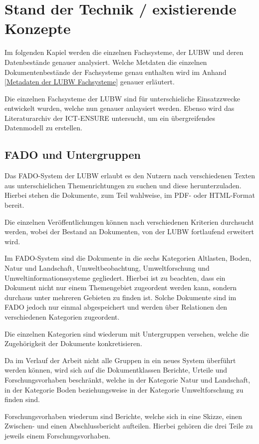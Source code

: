\section{Stand der Technik / existierende Konzepte} \label{Stand der Technik}
Im folgenden Kapiel werden die einzelnen Fachsysteme, der \ac{LUBW} und deren Datenbest\"ande genauer analysiert. Welche Metdaten die einzelnen Dokumentenbest\"ande der Fachsysteme genau enthalten wird im Anhand \ref{Metadaten der LUBW Fachsysteme} genauer erl\"autert. 

Die einzelnen Fachsysteme der \ac{LUBW} sind f\"ur unterschieliche Einsatzzwecke entwickelt wurden, welche nun genauer anlaysiert werden.
Ebenso wird das Literaturarchiv der \ac{ICT-ENSURE} untersucht, um ein \"ubergreifendes Datenmodell zu erstellen.

\subsection{FADO und Untergruppen} \label{FADO}
Das \ac{FADO}-System der \ac{LUBW} erlaubt es den Nutzern nach verschiedenen Texten aus unterschielichen Themenrichtungen zu suchen und diese herunterzuladen. Hierbei stehen die Dokumente, zum Teil wahlweise, im PDF- oder HTML-Format bereit.

Die einzelnen Ver\"offentlichungen k\"onnen nach verschiedenen Kriterien durchsucht werden, wobei der Bestand an Dokumenten, von der \ac{LUBW} fortlaufend erweitert wird.
\cite{LUBW_FADO}

Im \ac{FADO}-System sind die Dokumente in die sechs Kategorien Altlasten, Boden, Natur und Landschaft, Umweltbeobachtung, Umweltforschung und Umweltinformationssysteme gegliedert. Hierbei ist zu beachten, dass ein Dokument nicht nur einem Themengebiet zugeordent werden kann, sondern durchaus unter mehreren Gebieten zu finden ist. Solche Dokumente sind im \ac{FADO} jedoch nur einmal abgespeichert und werden \"uber Relationen den verschiedenen Kategorien zugeordent.

Die einzelnen Kategorien sind wiederum mit Untergruppen versehen, welche die Zugeh\"origkeit der Dokumente konkretisieren.

Da im Verlauf der Arbeit nicht alle Gruppen in ein neues System \"uberf\"uhrt werden k\"onnen, wird sich auf die Dokumentklassen Berichte, Urteile und Forschungsvorhaben beschr\"ankt, welche in der Kategorie Natur und Landschaft, in der Kategorie Boden beziehungsweise in der Kategorie Umweltforschung zu finden sind.

Forschungsvorhaben wiederum sind Berichte, welche sich in eine Skizze, einen Zwischen- und einen Abschlussbericht aufteilen. Hierbei geh\"oren die drei Teile zu jeweils einem Forschungsvorhaben.

